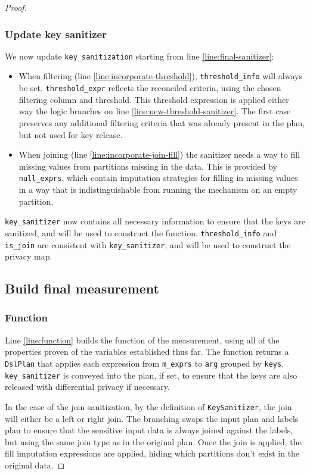 \documentclass{article}
\begin{document}
\begin{proof}
\subsubsection{Update key sanitizer}
We now update \texttt{key\_sanitization} starting from line \ref{line:final-sanitizer}:
\begin{itemize}
    \item When filtering (line \ref{line:incorporate-threshold}), \texttt{threshold\_info} will always be set. 
    \texttt{threshold\_expr} reflects the reconciled criteria, using the chosen filtering column and threshold. 
    This threshold expression is applied either way the logic branches on line \ref{line:new-threshold-sanitizer}.
    The first case preserves any additional filtering criteria that was already present in the plan, but not used for key release.
    \item When joining (line \ref{line:incorporate-join-fill}) the sanitizer needs a way to fill missing values from partitions missing in the data.
    This is provided by \texttt{null\_exprs}, which contain imputation strategies for filling in missing values 
    in a way that is indistinguishable from running the mechanism on an empty partition.
\end{itemize}

\texttt{key\_sanitizer} now contains all necessary information to ensure that the keys are sanitized, 
and will be used to construct the function.
\texttt{threshold\_info} and \texttt{is\_join} are consistent with \texttt{key\_sanitizer}, 
and will be used to construct the privacy map.

\subsection{Build final measurement}
\subsubsection{Function}
Line \ref{line:function} builds the function of the measurement,
using all of the properties proven of the variables established thus far.
The function returns a \texttt{DslPlan} that applies each expression from \texttt{m\_exprs}
to \texttt{arg} grouped by \texttt{keys}.
\texttt{key\_sanitizer} is conveyed into the plan, if set, 
to ensure that the keys are also released with differential privacy if necessary.

In the case of the join sanitization, by the definition of \texttt{KeySanitizer},
the join will either be a left or right join.
The branching swaps the input plan and labels plan to ensure that the sensitive input data is always joined against the labels,
but using the same join type as in the original plan.
Once the join is applied, the fill imputation expressions are applied, hiding which partitions don't exist in the original data.


\end{proof}
\end{document}
